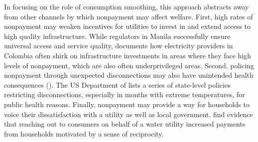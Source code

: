 \documentclass[12pt]{article}
\begin{document}
In focusing on the role of consumption smoothing, this approach abstracts away from other channels by which nonpayment may affect welfare.  First, high rates of nonpayment may weaken incentives for utilities to invest in and extend access to high quality infrastructure.  While regulators in Manila successfully ensure universal access and service quality, \cite{mcrae2015infrastructure} documents how electricity providers in Colombia often shirk on infrastructure investments in areas where they face high levels of nonpayment, which are also often underprivileged areas.  Second, policing nonpayment through unexpected disconnections may also have unintended health consequences (\cite{franklin2017}).  The US Department of \cite{liheap} lists a series of state-level policies restricting disconnections, especially in months with extreme temperatures, for public health reasons.  Finally, nonpayment may provide a way for households to voice their dissatisfaction with a utility as well as local government.  \cite{szabo2015reducing} find evidence that reaching out to consumers on behalf of a water utility increased payments from households motivated by a sense of reciprocity.  







\end{document}
